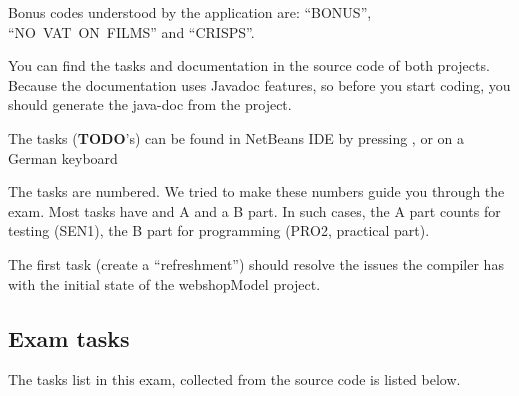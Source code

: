 \begin{itemize*}
\item Bonus codes understood by the application are: ``BONUS'',
  ``NO~VAT~ON~FILMS'' and ``CRISPS''.
\item You can find the tasks and documentation in the source code of both projects.
Because the documentation uses Javadoc features, so before you start
coding, you should generate the java-doc from the
 project.
\item The tasks (\textbf{TODO}'s) can be found in NetBeans IDE by pressing 
, or on a German keyboard 
\item The tasks are numbered. We tried to make these numbers guide you
through the exam. Most tasks have and A and a B part. In such cases,
the A part counts for testing (SEN1), the B part for programming
(PRO2, practical part).

\item The first task (create a ``refreshment'') should resolve the issues
the compiler has with the initial state of the webshopModel project.
\end{itemize*}
\subsection{Exam tasks}
The tasks list in this exam, collected from the source code is listed
below.
\nolinenumbers
\sloppypar
\setlength{\columnseprule}{.1pt}
\begin{multicols}{2}
  \small

\end{multicols}

